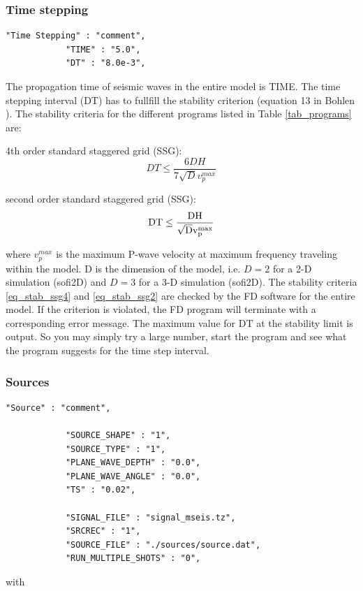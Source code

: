 \documentclass[11pt,onecolumn,oneside]{article}
\begin{document}
\subsubsection{Time stepping}
\begin{verbatim}
"Time Stepping" : "comment",
			"TIME" : "5.0",
			"DT" : "8.0e-3",
\end{verbatim}
The propagation time of seismic waves in the entire model is TIME. The time stepping interval (DT) has to fullfill the stability criterion (equation 13 in Bohlen ). The stability criteria for the different programs listed in Table \ref{tab_programs} are: 

4th order standard staggered grid (SSG):
\begin{equation}
DT \le \frac{6 DH}{7\sqrt{D} v_p^{max}}
\label{eq_stab_ssg4}
\end{equation}

second order standard staggered grid (SSG):
\begin{equation}
\rm{DT} \le \frac{DH}{\sqrt{D} v_p^{max}}
\label{eq_stab_ssg2}
\end{equation}

where $v_p^{max}$ is the maximum P-wave velocity at maximum frequency traveling within  the model. D is the dimension of the model, i.e. $D=2$ for a 2-D simulation (sofi2D) and $D=3$ for a 3-D simulation (sofi2D). The stability criteria \ref{eq_stab_ssg4} and \ref{eq_stab_ssg2} are checked by the FD software for the entire model. If the criterion is violated, the FD program will terminate with a corresponding error message. The maximum value for DT at the stability  limit is output. So you may simply try a large number, start the program and see what the program suggests for the time step interval.

\subsubsection{Sources}
\label{sources}
\begin{verbatim}
"Source" : "comment",

			"SOURCE_SHAPE" : "1",
			"SOURCE_TYPE" : "1",
			"PLANE_WAVE_DEPTH" : "0.0",
			"PLANE_WAVE_ANGLE" : "0.0",
			"TS" : "0.02",
	
			"SIGNAL_FILE" : "signal_mseis.tz",
			"SRCREC" : "1",
			"SOURCE_FILE" : "./sources/source.dat", 
			"RUN_MULTIPLE_SHOTS" : "0",
\end{verbatim}

with
\end{document}
